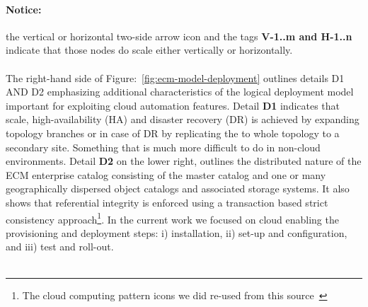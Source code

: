 \documentclass[EPiC]{easychair} %
\begin{document}
    \paragraph{Notice:}the vertical or horizontal two-side arrow icon and the tags\textbf{ V-1..m and H-1..n} indicate that those nodes do scale either vertically or horizontally.\\\\ 
    \noindent The right-hand side of Figure:~\ref{fig:ecm-model-deployment} outlines details D1 AND D2 emphasizing additional characteristics of the logical deployment model important for exploiting cloud automation features. Detail \textbf{D1} indicates that scale, high-availability (HA) and disaster recovery (DR) is achieved by expanding topology branches or in case of DR by replicating the to whole topology to a secondary site. Something that is much more difficult to do in non-cloud environments. Detail \textbf{D2} on the lower right, outlines the distributed nature of the ECM enterprise catalog consisting of the master catalog and one or many geographically dispersed object catalogs and associated storage systems. It also shows that referential integrity is enforced using a transaction based strict consistency approach\footnote{The cloud computing pattern icons we did re-used from this source~\cite{CloudComputingPatterns2014}}. In the current work we focused on cloud enabling the provisioning and deployment steps: i) installation, ii) set-up and configuration, and iii) test and roll-out.\\\\
\end{document}

